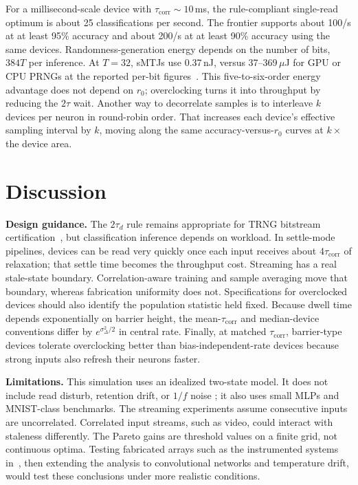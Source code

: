 \documentclass[journal]{IEEEtran}
\newcommand{\rzero}{r_0}
\newcommand{\tauc}{\tau_{\mathrm{corr}}}
\begin{document}
For a millisecond-scale device with $\tauc\sim10$\,ms, the rule-compliant
single-read optimum is about 25 classifications per second. The frontier
supports about 100/s at at least 95\% accuracy and about 200/s at at least
90\% accuracy using the same devices. Randomness-generation energy depends
on the number of bits, $384T$ per inference. At $T{=}32$, sMTJs use
0.37\,nJ, versus 37--369\,$\mu$J for GPU or CPU PRNGs at the reported
per-bit figures~\cite{sun2026superparamagnetic}. This five-to-six-order
energy advantage does not depend on $\rzero$; overclocking turns it into
throughput by reducing the $2\tau$ wait. Another way to decorrelate samples
is to interleave $k$ devices per neuron in round-robin order. That increases
each device's effective sampling interval by $k$, moving along the same
accuracy-versus-$\rzero$ curves at $k\times$ the device area.

\section{Discussion}
\label{sec:discussion}
\textbf{Design guidance.} The $2\tau_d$ rule remains appropriate for TRNG
bitstream certification~\cite{vodenicarevic2017low,sun2026superparamagnetic},
but classification inference depends on workload. In settle-mode pipelines,
devices can be read very quickly once each input receives about $4\tauc$ of
relaxation; that settle time becomes the throughput cost. Streaming has a
real stale-state boundary. Correlation-aware training and sample averaging
move that boundary, whereas fabrication uniformity does not. Specifications
for overclocked devices should also identify the population statistic held
fixed. Because dwell time depends exponentially on barrier height, the
mean-$\tauc$ and median-device conventions differ by
$e^{\sigma_\Delta^2/2}$ in central rate. Finally, at matched $\tauc$,
barrier-type devices tolerate overclocking better than bias-independent-rate
devices because strong inputs also refresh their neurons faster.

\textbf{Limitations.} This simulation uses an idealized two-state model. It
does not include read disturb, retention drift, or $1/f$ noise
\cite{sun2026superparamagnetic}; it also uses small MLPs and MNIST-class
benchmarks. The streaming experiments assume consecutive inputs are
uncorrelated. Correlated input streams, such as video, could interact with
staleness differently. The Pareto gains are threshold values on a finite
grid, not continuous optima. Testing fabricated arrays such as the
instrumented systems in~\cite{singh2024cmos}, then extending the analysis to
convolutional networks and temperature drift, would test these conclusions
under more realistic conditions.
\end{document}
